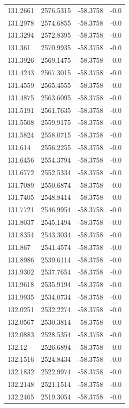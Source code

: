 \begin{table}[H]
\begin{tabular}{llll}
131.2661 & 2576.5315 & -58.3758 & -0.0 \\
131.2978 & 2574.6855 & -58.3758 & -0.0 \\
131.3294 & 2572.8395 & -58.3758 & -0.0 \\
131.361 & 2570.9935 & -58.3758 & -0.0 \\
131.3926 & 2569.1475 & -58.3758 & -0.0 \\
131.4243 & 2567.3015 & -58.3758 & -0.0 \\
131.4559 & 2565.4555 & -58.3758 & -0.0 \\
131.4875 & 2563.6095 & -58.3758 & -0.0 \\
131.5191 & 2561.7635 & -58.3758 & -0.0 \\
131.5508 & 2559.9175 & -58.3758 & -0.0 \\
131.5824 & 2558.0715 & -58.3758 & -0.0 \\
131.614 & 2556.2255 & -58.3758 & -0.0 \\
131.6456 & 2554.3794 & -58.3758 & -0.0 \\
131.6772 & 2552.5334 & -58.3758 & -0.0 \\
131.7089 & 2550.6874 & -58.3758 & -0.0 \\
131.7405 & 2548.8414 & -58.3758 & -0.0 \\
131.7721 & 2546.9954 & -58.3758 & -0.0 \\
131.8037 & 2545.1494 & -58.3758 & -0.0 \\
131.8354 & 2543.3034 & -58.3758 & -0.0 \\
131.867 & 2541.4574 & -58.3758 & -0.0 \\
131.8986 & 2539.6114 & -58.3758 & -0.0 \\
131.9302 & 2537.7654 & -58.3758 & -0.0 \\
131.9618 & 2535.9194 & -58.3758 & -0.0 \\
131.9935 & 2534.0734 & -58.3758 & -0.0 \\
132.0251 & 2532.2274 & -58.3758 & -0.0 \\
132.0567 & 2530.3814 & -58.3758 & -0.0 \\
132.0883 & 2528.5354 & -58.3758 & -0.0 \\
132.12 & 2526.6894 & -58.3758 & -0.0 \\
132.1516 & 2524.8434 & -58.3758 & -0.0 \\
132.1832 & 2522.9974 & -58.3758 & -0.0 \\
132.2148 & 2521.1514 & -58.3758 & -0.0 \\
132.2465 & 2519.3054 & -58.3758 & -0.0 \\

\end{tabular}
\end{table}
